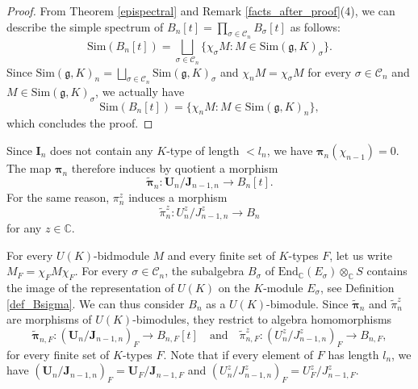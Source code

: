 \documentclass{amsart}
\theoremstyle{definition}
\begin{document}
\begin{proof}
    From Theorem \ref{epispectral} and Remark \ref{facts_after_proof}(4), we can describe the simple spectrum of $B_n[t] = \prod_{\sigma \in \mathcal{C}_n}B_\sigma[t]$ as follows:
    \begin{equation*}
        \mathrm{Sim}(B_n[t]) = \bigsqcup_{\sigma\in \mathcal{C}_n} \{\chi_\sigma M : M \in \mathrm{Sim}(\bm{\mathfrak{g}},K)_\sigma\}.
    \end{equation*}
    Since $\mathrm{Sim}(\bm{\mathfrak{g}},K)_n = \bigsqcup_{\sigma \in \mathcal{C}_n}\mathrm{Sim}(\bm{\mathfrak{g}},K)_\sigma$ and $\chi_n M = \chi_\sigma M$ for every $\sigma\in \mathcal{C}_n$ and $M\in \mathrm{Sim}(\bm{\mathfrak{g}},K)_\sigma$, we actually have
    \begin{equation*}
        \mathrm{Sim}(B_n[t]) = \{\chi_n M : M \in \mathrm{Sim}(\bm{\mathfrak{g}},K)_n\},
    \end{equation*}
    which concludes the proof.
\end{proof}

Since $\bm{I}_n$ does not contain any $K$-type of length $<l_n$, we have $\bm{\pi}_n(\chi_{n-1}) =  0$. The map $\bm{\pi}_n$ therefore induces by quotient a morphism
\[\tilde{\bm{\pi}}_n : \bm{U}_n/\bm{J}_{n-1,n} \to B_n[t].\]
For the same reason, $\pi^z_n$ induces a morphism
\[\tilde{\pi}^z_n : U^z_n/J^z_{n-1,n} \to B_n\] for any $z \in \mathbb{C}$.

For every $U(K)$-bidmodule $M$ and every finite set of $K$-types $F$, let us write $M_F = \chi_F M\chi_F$. For every $\sigma \in \mathcal{C}_n$, the subalgebra $B_\sigma$ of $\mathrm{End}_\mathbb{C}(E_\sigma)\otimes_\mathbb{C} S$ contains the image of the representation of $U(K)$ on the $K$-module $E_\sigma$, see Definition \ref{def_Bsigma}. We can thus consider $B_n$ as a $U(K)$-bimodule. Since $\tilde{\bm{\pi}}_n$ and $\tilde{\pi}_n^z$ are morphisms of $U(K)$-bimodules, they restrict to algebra homomorphisms
\[\tilde{\bm{\pi}}_{n,F} : (\bm{U}_n/ \bm{J}_{n-1,n})_F \to B_{n,F}[t]\quad \text{and} \quad \tilde{\pi}_{n,F}^z : (U^z_n/J^z_{n-1,n})_F \to B_{n,F},\] for every finite set of $K$-types $F$. Note that if every element of $F$ has length $l_n$, we have $(\bm{U}_n/ \bm{J}_{n-1,n})_F = \bm{U}_F / \bm{J}_{n-1,F}$ and $(U^z_n/J^z_{n-1,n})_F = U^z_F / J^z_{n-1,F}$.
\end{document}

